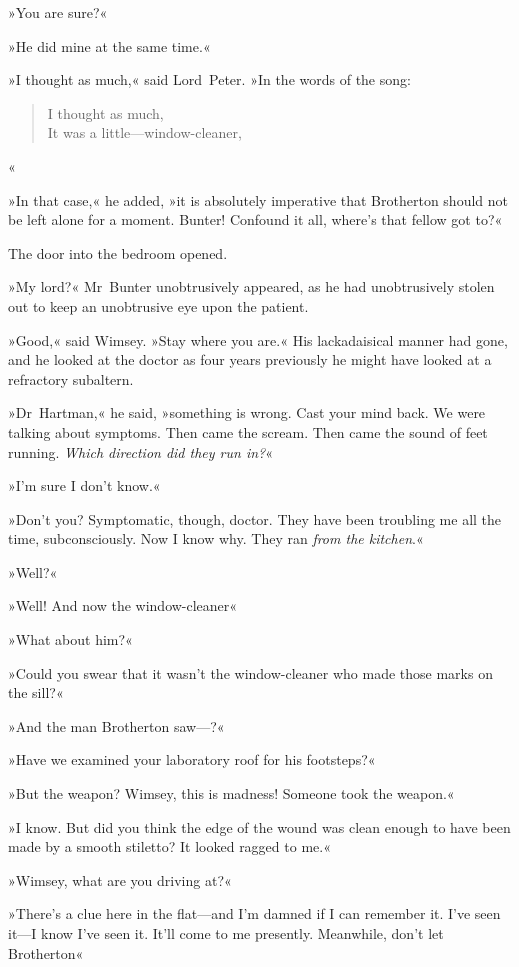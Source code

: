 »You are sure?«

»He did mine at the same time.«

»I thought as much,« said Lord~Peter. »In the words of the song:

\begin{verse}
I thought as much,\\
It was a little—window-cleaner,
\end{verse}«

»In that case,« he added, »it is absolutely imperative that Brotherton should not be left alone for a moment. Bunter! Confound it all, where's that fellow got to?«

The door into the bedroom opened.

»My lord?« Mr~Bunter unobtrusively appeared, as he had unobtrusively stolen out to keep an unobtrusive eye upon the patient.

»Good,« said Wimsey. »Stay where you are.« His lackadaisical manner had gone, and he looked at the doctor as four years previously he might have looked at a refractory subaltern.

»Dr~Hartman,« he said, »something is wrong. Cast your mind back. We were talking about symptoms. Then came the scream. Then came the sound of feet running. \textit{Which direction did they run in?}«

»I'm sure I don't know.«

»Don't you? Symptomatic, though, doctor. They have been troubling me all the time, subconsciously. Now I know why. They ran \textit{from the kitchen}.«

»Well?«

»Well! And now the window-cleaner\longdash«

»What about him?«

»Could you swear that it wasn't the window-cleaner who made those marks on the sill?«

»And the man Brotherton saw—?«

»Have we examined your laboratory roof for his footsteps?«

»But the weapon? Wimsey, this is madness! Someone took the weapon.«

»I know. But did you think the edge of the wound was clean enough to have been made by a smooth stiletto? It looked ragged to me.«

»Wimsey, what are you driving at?«

»There's a clue here in the flat—and I'm damned if I can remember it. I've seen it—I know I've seen it. It'll come to me presently. Meanwhile, don't let Brotherton\longdash«

